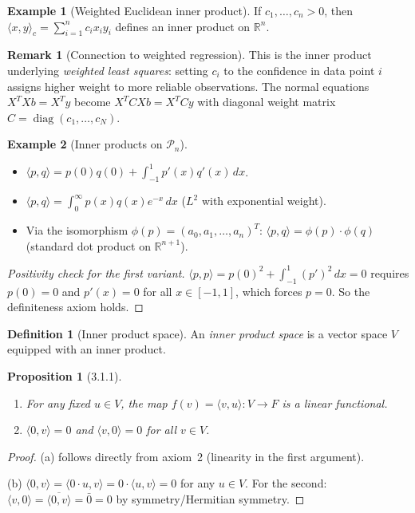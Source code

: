 \documentclass[11pt]{article}
\theoremstyle{definition}
\newtheorem{definition}{Definition}[section]
\newtheorem{example}{Example}[section]
\newtheorem{remark}{Remark}[section]
\theoremstyle{plain}
\newtheorem{proposition}{Proposition}[section]
\begin{document}
\begin{example}[Weighted Euclidean inner product]
  If $c_1,\ldots,c_n > 0$, then
  $\langle x, y\rangle_c = \sum_{i=1}^n c_i x_i y_i$
  defines an inner product on $\mathbb{R}^n$.
  \begin{remark}[Connection to weighted regression]
    This is the inner product underlying \emph{weighted least squares}:
    setting $c_i$ to the confidence in data point $i$ assigns higher
    weight to more reliable observations.  The normal equations
    $X^TXb = X^Ty$ become $X^TCXb = X^TCy$ with diagonal weight matrix
    $C = \operatorname{diag}(c_1,\ldots,c_N)$.
  \end{remark}
\end{example}

\begin{example}[Inner products on $\mathcal{P}_n$]
  \leavevmode
  \begin{itemize}
    \item $\langle p, q\rangle = p(0)q(0) + \displaystyle\int_{-1}^1 p'(x)q'(x)\,dx$.
    \item $\langle p, q\rangle = \displaystyle\int_0^\infty p(x)q(x)e^{-x}\,dx$
          \quad ($L^2$ with exponential weight).
    \item Via the isomorphism $\phi(p) = (a_0,a_1,\ldots,a_n)^T$:
          $\langle p, q\rangle = \phi(p)\cdot\phi(q)$
          (standard dot product on $\mathbb{R}^{n+1}$).
  \end{itemize}
  \begin{proof}[Positivity check for the first variant]
    $\langle p, p\rangle = p(0)^2 + \int_{-1}^1 (p')^2\,dx = 0$
    requires $p(0) = 0$ and $p'(x) = 0$ for all $x \in [-1,1]$,
    which forces $p = 0$.  So the definiteness axiom holds.
  \end{proof}
\end{example}

\begin{definition}[Inner product space]
  An \emph{inner product space} is a vector space $V$ equipped with an
  inner product.
\end{definition}

\begin{proposition}[3.1.1]
  \leavevmode
  \begin{enumerate}
    \item[(a)] For any fixed $u \in V$, the map $f(v) = \langle v, u\rangle : V \to F$
               is a linear functional.
    \item[(b)] $\langle 0, v\rangle = 0$ and $\langle v, 0\rangle = 0$ for all $v \in V$.
  \end{enumerate}
\end{proposition}
\begin{proof}
  (a) follows directly from axiom~2 (linearity in the first argument).

  (b) $\langle 0, v\rangle = \langle 0\cdot u, v\rangle = 0\cdot\langle u, v\rangle = 0$
  for any $u \in V$.
  For the second: $\langle v, 0\rangle = \overline{\langle 0, v\rangle} = \bar{0} = 0$
  by symmetry/Hermitian symmetry.
\end{proof}
\end{document}
